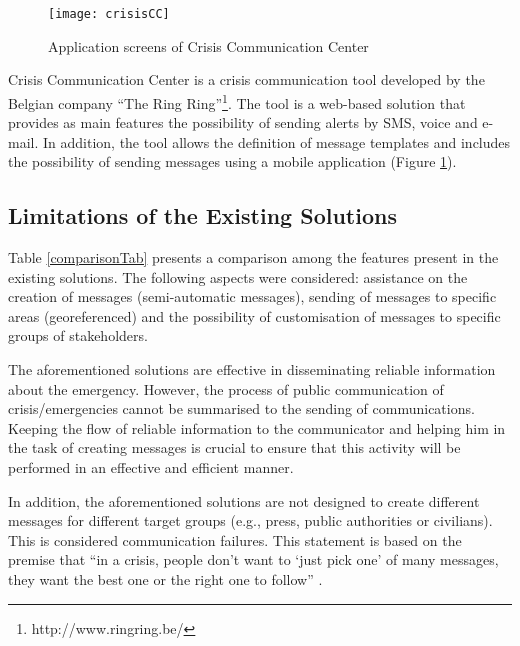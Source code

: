 \begin{figure}[]
\begin{center}
  \texttt{[image: crisisCC]}
\caption{Application screens of Crisis Communication Center}
\label{fig:crisisCC}
\end{center}
\end{figure}

Crisis Communication Center is a crisis communication tool developed by the Belgian company “The Ring Ring”\footnote{http://www.ringring.be/}. The tool is a web-based solution that provides as main features the possibility of sending alerts by SMS, voice and e-mail. In addition, the tool allows the definition of message templates and includes the possibility of sending messages using a mobile application (Figure \ref{fig:crisisCC}).



\subsection{Limitations of the Existing Solutions}





Table \ref{comparisonTab} presents a comparison among the features present in the existing solutions. The following aspects were considered: assistance on the creation of messages (semi-automatic messages), sending of messages to specific areas (georeferenced) and the possibility of customisation of messages to specific groups of stakeholders. 

The aforementioned solutions are effective in disseminating reliable information about the emergency. However, the process of public communication of crisis/emergencies cannot be summarised to the sending of communications. Keeping the flow of reliable information to the communicator and helping him in the task of creating messages is crucial to ensure that this activity will be performed in an effective and efficient manner. 

In addition, the aforementioned solutions are not designed to create different messages for different target groups (e.g., press, public authorities or civilians). This is considered communication failures. This statement is based on the premise that “in a crisis, people don’t want to ‘just pick one’ of many messages, they want the best one or the right one to follow” \cite{reynolds2007crisis}.


